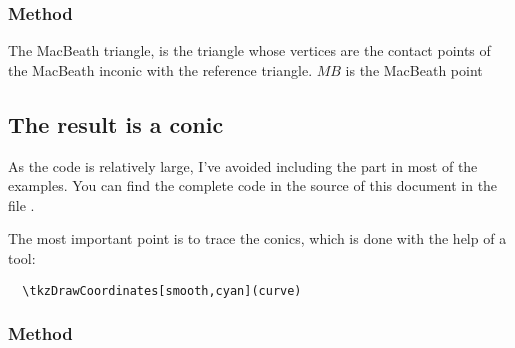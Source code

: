 
\subsubsection{Method } %
\label{ssub:method_triangle_macbeath}
The MacBeath triangle, is the triangle whose vertices are the contact points of the MacBeath inconic with the reference triangle. $MB$ is the MacBeath  point

\begin{tkzexample}[latex=.5\textwidth]
\end{tkzexample}






\subsection{The result is a conic} %
\label{sub:the_result_is_a_conic}

As the code is relatively large, I've avoided including the  part in most of the examples. You can find the complete code in the source of this document in the file .

The most important point is to trace the conics, which is done with the help of a tool:

\begin{mybox}
\begin{verbatim}
  \tkzDrawCoordinates[smooth,cyan](curve)
\end{verbatim}
\end{mybox}

\subsubsection{Method } %
\label{ssub:method_triangle_kiepert_parabola}


